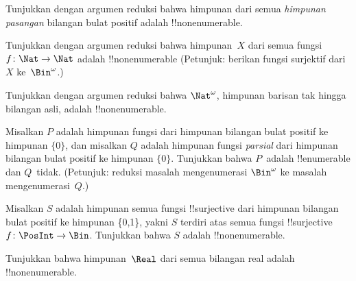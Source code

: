 \documentclass[../../../include/open-logic-section]{subfiles}
\begin{document}
\begin{prob}
Tunjukkan dengan argumen reduksi bahwa himpunan dari semua \emph{himpunan
pasangan} bilangan bulat positif adalah !!{nonenumerable}.
\end{prob}

\begin{prob}\label{sfr:siz:red:prob:nat-nat}
  Tunjukkan dengan argumen reduksi bahwa himpunan~$X$ dari semua fungsi
  $f\colon \Nat \to \Nat$ adalah !!{nonenumerable} (Petunjuk: berikan fungsi
  surjektif dari $X$ ke~$\Bin^\omega$.)
\end{prob}

\begin{prob}
Tunjukkan dengan argumen reduksi bahwa $\Nat^\omega$, himpunan barisan tak
hingga bilangan asli, adalah !!{nonenumerable}.
\end{prob}

\begin{prob}
Misalkan $P$ adalah himpunan fungsi dari himpunan bilangan bulat positif ke
himpunan $\{0\}$, dan misalkan $Q$ adalah himpunan fungsi \emph{parsial} dari
himpunan bilangan bulat positif ke himpunan $\{0\}$. Tunjukkan bahwa $P$~adalah
!!{enumerable} dan $Q$~tidak. (Petunjuk: reduksi masalah mengenumerasi
$\Bin^\omega$ ke masalah mengenumerasi~$Q$.)
\end{prob}

\begin{prob}
Misalkan $S$ adalah himpunan semua fungsi !!{surjective} dari himpunan bilangan
bulat positif ke himpunan \{0,1\}, yakni $S$ terdiri atas semua fungsi
!!{surjective}~$f\colon \PosInt \to \Bin$. Tunjukkan bahwa $S$ adalah
!!{nonenumerable}.
\end{prob}

\begin{prob}
Tunjukkan bahwa himpunan~$\Real$ dari semua bilangan real adalah
!!{nonenumerable}.
\end{prob}
\end{document}
